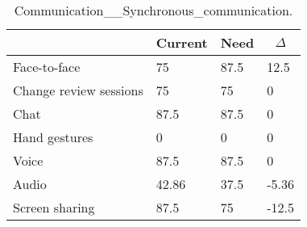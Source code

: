 
  \begin{table*}[]
  \centering
  \notsotiny
  \caption{ Communication__Synchronous_communication.}
\label{tab:communication__synchronous_communication}
\begin{tabular}{|l|l|l|l|}
  \hline
  \rowcolor[HTML]{C0C0C0}
    \multicolumn{1}{|c|}{Feature} & \multicolumn{1}{c|}{Current} & \multicolumn{1}{c|}{Need} & \multicolumn{1}{c|}{$\Delta$} \\ \hline
  Face-to-face & 75 & 87.5 & 12.5 \\ \hline 
Change review sessions & 75 & 75 & 0 \\ \hline 
Chat & 87.5 & 87.5 & 0 \\ \hline 
Hand gestures & 0 & 0 & 0 \\ \hline 
Voice & 87.5 & 87.5 & 0 \\ \hline 
Audio & 42.86 & 37.5 & -5.36 \\ \hline 
Screen sharing & 87.5 & 75 & -12.5 \\ \hline 
\end{tabular}%
  \end{table*}